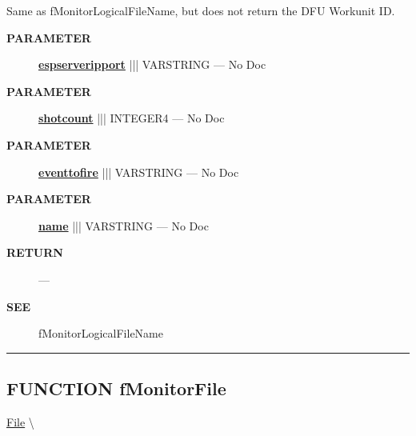 \par





Same as fMonitorLogicalFileName, but does not return the DFU Workunit ID.






\par
\begin{description}
\item [\colorbox{tagtype}{\color{white} \textbf{\textsf{PARAMETER}}}] \textbf{\underline{espserveripport}} ||| VARSTRING --- No Doc
\item [\colorbox{tagtype}{\color{white} \textbf{\textsf{PARAMETER}}}] \textbf{\underline{shotcount}} ||| INTEGER4 --- No Doc
\item [\colorbox{tagtype}{\color{white} \textbf{\textsf{PARAMETER}}}] \textbf{\underline{eventtofire}} ||| VARSTRING --- No Doc
\item [\colorbox{tagtype}{\color{white} \textbf{\textsf{PARAMETER}}}] \textbf{\underline{name}} ||| VARSTRING --- No Doc
\end{description}







\par
\begin{description}
\item [\colorbox{tagtype}{\color{white} \textbf{\textsf{RETURN}}}] \textbf{} --- 
\end{description}






\par
\begin{description}
\item [\colorbox{tagtype}{\color{white} \textbf{\textsf{SEE}}}] fMonitorLogicalFileName
\end{description}




\rule{\linewidth}{0.5pt}
\subsection*{\textsf{\colorbox{headtoc}{\color{white} FUNCTION}
fMonitorFile}}

\hypertarget{ecldoc:file.fmonitorfile}{}
\hspace{0pt} \hyperlink{ecldoc:File}{File} \textbackslash 

